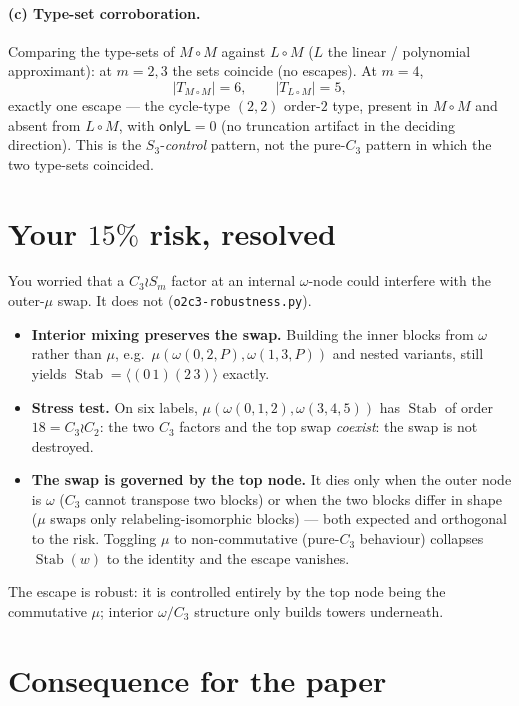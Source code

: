 \documentclass[11pt]{article}
\newcommand{\Stab}{\operatorname{Stab}}
\newcommand{\Mcont}{M}
\newcommand{\Lin}{L}
\newcommand{\Cthree}{C_3}
\newcommand{\Ctwo}{C_2}
\begin{document}
\paragraph{(c) Type-set corroboration.}
Comparing the type-sets of $\Mcont\circ\Mcont$ against $\Lin\circ\Mcont$ ($\Lin$ the linear /
polynomial approximant): at $m=2,3$ the sets coincide (no escapes). At $m=4$,
\[
  |T_{\Mcont\circ\Mcont}| = 6, \qquad |T_{\Lin\circ\Mcont}| = 5,
\]
exactly one escape --- the cycle-type $(2,2)$ order-$2$ type, present in $\Mcont\circ\Mcont$ and
absent from $\Lin\circ\Mcont$, with $\textsf{onlyL}=0$ (no truncation artifact in the deciding
direction). This is the $S_3$-\emph{control} pattern, not the pure-$\Cthree$ pattern in which the
two type-sets coincided.

\section{Your $15\%$ risk, resolved}

You worried that a $\Cthree \wr S_m$ factor at an internal $\omega$-node could interfere with the
outer-$\mu$ swap. It does not (\texttt{o2c3-robustness.py}).

\begin{itemize}[leftmargin=1.4em]
\item \textbf{Interior mixing preserves the swap.} Building the inner blocks from $\omega$ rather
than $\mu$, e.g.\ $\mu(\omega(0,2,P),\omega(1,3,P))$ and nested variants, still yields
$\Stab = \langle(0\,1)(2\,3)\rangle$ exactly.
\item \textbf{Stress test.} On six labels, $\mu(\omega(0,1,2),\omega(3,4,5))$ has
$\Stab$ of order $18 = \Cthree \wr \Ctwo$: the two $\Cthree$ factors and the top swap
\emph{coexist}: the swap is not destroyed.
\item \textbf{The swap is governed by the top node.} It dies only when the outer node is $\omega$
($\Cthree$ cannot transpose two blocks) or when the two blocks differ in shape ($\mu$ swaps only
relabeling-isomorphic blocks) --- both expected and orthogonal to the risk. Toggling $\mu$ to
non-commutative (pure-$\Cthree$ behaviour) collapses $\Stab(w)$ to the identity and the escape
vanishes.
\end{itemize}
\noindent The escape is robust: it is controlled entirely by the top node being the commutative
$\mu$; interior $\omega/\Cthree$ structure only builds towers underneath.

\section{Consequence for the paper}
\end{document}
